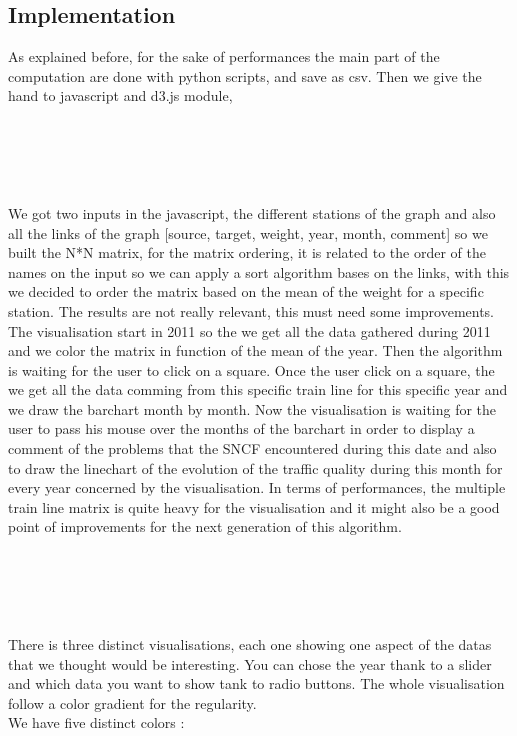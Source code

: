\documentclass{vgtc}
\begin{document}
\subsection{Implementation}
\indent
As explained before, for the sake of performances the main part of the computation are done with python scripts, and save as csv. Then we give the hand to javascript and d3.js module, 
\\
\\
\\
\\
\\
\\
We got two inputs in the javascript, the different stations of the graph and also all the links of the graph [source, target, weight, year, month, comment] so we built the N*N matrix, for the matrix ordering, it is related to the order of the names on the input so we can apply a sort algorithm bases on the links, with this we decided to order the matrix based on the mean of the weight for a specific station. The results are not really relevant, this must need some improvements. The visualisation start in 2011 so the we get all the data gathered during 2011 and we color the matrix in function of the mean of the year. Then the algorithm is waiting for the user to click on a square. Once the user click on a square, the we get all the data comming from this specific train line for this specific year and we draw the barchart month by month. Now the visualisation is waiting for the user to pass his mouse over the months of the barchart in order to display a comment of the problems that the SNCF encountered during this date and also to draw the linechart of the evolution of the traffic quality during this month for every year concerned by the visualisation.
In terms of performances, the multiple train line matrix is quite heavy for the visualisation and it might also be a good point of improvements for the next generation of this algorithm.
\\
\\
\\
\\
\\
\\
\indent
There is three distinct visualisations, each one showing one aspect of the datas that we thought would be interesting. You can chose the year thank to a slider and which data you want to show tank to radio buttons. The whole visualisation follow a color gradient for the regularity.\\
We have five distinct colors : \\
\end{document}
